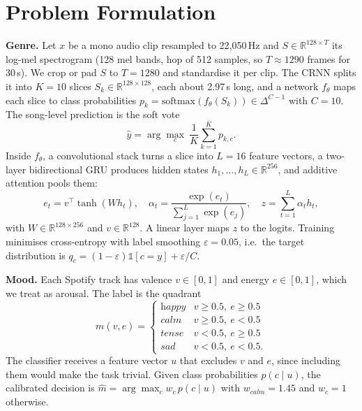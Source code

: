 \documentclass[conference]{IEEEtran}
\begin{document}
\section{Problem Formulation}
\textbf{Genre.} Let $x$ be a mono audio clip resampled to 22{,}050\,Hz and $S\in\mathbb{R}^{128\times T}$ its log-mel spectrogram (128 mel bands, hop of 512 samples, so $T\approx1290$ frames for 30\,s). We crop or pad $S$ to $T=1280$ and standardise it per clip. The CRNN splits it into $K=10$ slices $S_k\in\mathbb{R}^{128\times128}$, each about 2.97\,s long, and a network $f_\theta$ maps each slice to class probabilities $p_k=\mathrm{softmax}(f_\theta(S_k))\in\Delta^{C-1}$ with $C=10$. The song-level prediction is the soft vote
\begin{equation}
\hat{y}=\arg\max_{c}\ \frac{1}{K}\sum_{k=1}^{K}p_{k,c}.
\label{eq:vote}
\end{equation}
Inside $f_\theta$, a convolutional stack turns a slice into $L=16$ feature vectors, a two-layer bidirectional GRU produces hidden states $h_1,\dots,h_L\in\mathbb{R}^{256}$, and additive attention pools them:
\begin{equation}
e_t=v^{\top}\tanh(Wh_t),\quad \alpha_t=\frac{\exp(e_t)}{\sum_{j=1}^{L}\exp(e_j)},\quad z=\sum_{t=1}^{L}\alpha_t h_t ,
\label{eq:attn}
\end{equation}
with $W\in\mathbb{R}^{128\times256}$ and $v\in\mathbb{R}^{128}$. A linear layer maps $z$ to the logits. Training minimises cross-entropy with label smoothing $\varepsilon=0.05$, i.e.\ the target distribution is $q_c=(1-\varepsilon)\mathbb{1}[c=y]+\varepsilon/C$.

\textbf{Mood.} Each Spotify track has valence $v\in[0,1]$ and energy $e\in[0,1]$, which we treat as arousal. The label is the quadrant
\begin{equation}
m(v,e)=\begin{cases}
\textit{happy} & v\ge0.5,\ e\ge0.5\\
\textit{calm} & v\ge0.5,\ e<0.5\\
\textit{tense} & v<0.5,\ e\ge0.5\\
\textit{sad} & v<0.5,\ e<0.5 .
\end{cases}
\end{equation}
The classifier receives a feature vector $u$ that excludes $v$ and $e$, since including them would make the task trivial. Given class probabilities $p(c\mid u)$, the calibrated decision is $\hat{m}=\arg\max_c w_c\,p(c\mid u)$ with $w_{\textit{calm}}=1.45$ and $w_c=1$ otherwise.
\end{document}
